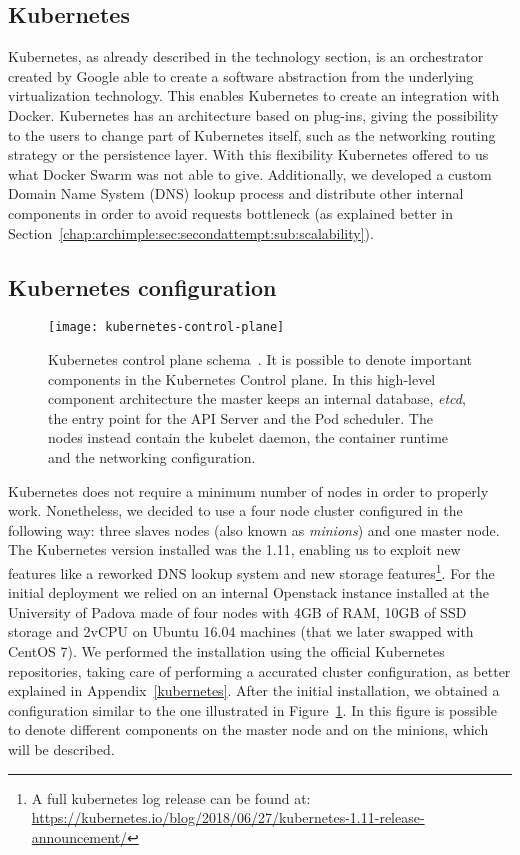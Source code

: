 \subsection{Kubernetes}
Kubernetes, as already described in the technology section, is an orchestrator
created by Google able to create a software abstraction from the underlying
virtualization technology. This enables Kubernetes to create an integration with
Docker. Kubernetes has an architecture based on plug-ins, giving the possibility
to the users to change part of Kubernetes itself, such as the networking routing
strategy or the persistence layer. With this flexibility Kubernetes offered to
us what Docker Swarm was not able to give. Additionally, we developed a custom
Domain Name System (DNS) lookup process and distribute other internal components
in order to avoid requests bottleneck (as explained better in
Section~\ref{chap:archimple:sec:secondattempt:sub:scalability}).

\subsection{Kubernetes configuration}
\label{chap:archimpl:sec:secondattempt:sec:k8s}
\begin{figure}[t]
  \centering
  \texttt{[image: kubernetes-control-plane]}
  \caption[Kubernetes control plane schema]{Kubernetes control plane
    schema~\cite{k8scp}. It is possible to denote important components in the
    Kubernetes Control plane. In this high-level component architecture the
    master keeps an internal database, \emph{etcd}, the entry point for the API
    Server and the Pod scheduler. The nodes instead contain the kubelet daemon,
    the container runtime and the networking configuration.}
  \label{chap:archimpl:sec:secondattempt:img:k8scp}
\end{figure}

Kubernetes does not require a minimum number of nodes in order to properly work.
Nonetheless, we decided to use a four node cluster configured in the following
way: three slaves nodes (also known as \emph{minions}) and one master node. The
Kubernetes version installed was the 1.11, enabling us to exploit new features
like a reworked DNS lookup system and new storage features\footnote{A full
  kubernetes log release can be found at:
  \url{https://kubernetes.io/blog/2018/06/27/kubernetes-1.11-release-announcement/}}.
For the initial deployment we relied on an internal Openstack instance installed
at the University of Padova made of four nodes with 4GB of RAM, 10GB of SSD
storage and 2vCPU on Ubuntu 16.04 machines (that we later swapped with CentOS
7). We performed the installation using the official Kubernetes repositories,
taking care of performing a accurated cluster configuration, as better explained
in Appendix~\ref{kubernetes}. After the initial installation, we obtained a
configuration similar to the one illustrated in
Figure~\ref{chap:archimpl:sec:secondattempt:img:k8scp}. In this figure is
possible to denote different components on the master node and on the minions,
which will be described.

